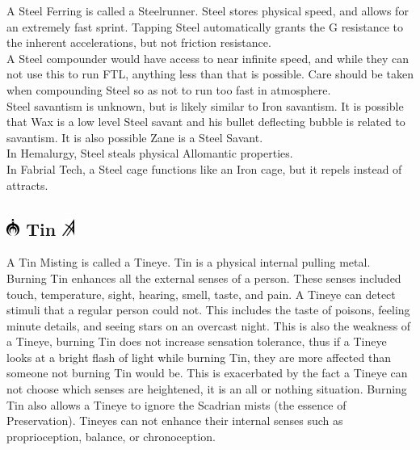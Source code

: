 \documentclass[conference]{IEEEtran}
\begin{document}
A Steel Ferring is called a Steelrunner.  Steel stores physical speed, and allows for an extremely fast sprint.\cite{ARS}  Tapping Steel automatically grants the G resistance to the inherent accelerations\cite{steel-g-air}, but not friction resistance.\cite{steel-air}\\

A Steel compounder would have access to near infinite speed, and while they can not use this to run FTL,\cite{steel-ftl} anything less than that is possible.  Care should be taken when compounding Steel so as not to run too fast in atmosphere.\cite{steel-air}\\

Steel savantism is unknown, but is likely similar to Iron savantism.  It is possible that Wax is a low level Steel savant and his bullet deflecting bubble is related to savantism.\cite{AoL-pre}\cite{wax-savant}
It is also possible Zane is a Steel Savant.\cite{WoA-CH17}\\

In Hemalurgy, Steel steals physical Allomantic properties.\cite{HE-TB}\\

In Fabrial Tech, a Steel cage functions like an Iron cage, but it repels instead of attracts.\cite{RoW-E11}

\subsection*{\includegraphics[height=1em]{images/Tin.png}  Tin \includegraphics[height=1em]{images/Tin_(Feruchemy).png}}
A Tin Misting is called a Tineye.\cite{ARS}  Tin is a physical internal pulling metal.  Burning Tin enhances all the external senses of a person.\cite{AL-TB}  These senses included touch, temperature, sight, hearing, smell, taste, and pain.\cite{ARS}  A Tineye can detect stimuli that a regular person could not.  This includes the taste of poisons,\cite{WoA-CH18} feeling minute details, and seeing stars on an overcast night.\cite{TFE-CH7}  This is also the weakness of a Tineye, burning Tin does not increase sensation tolerance, thus if a Tineye looks at a bright flash of light while burning Tin,\cite{TFE-CH7} they are more affected than someone not burning Tin would be.  This is exacerbated by the fact a Tineye can not choose which senses are heightened,\cite{TFE-CH32} it is an all or nothing situation.  Burning Tin also allows a Tineye to ignore the Scadrian mists\cite{TFE-CH7} (the essence of Preservation)\cite{HoA-CH75}.  Tineyes can not enhance their internal senses such as proprioception, balance, or chronoception.\cite{HoA-CH41}\\
\end{document}
